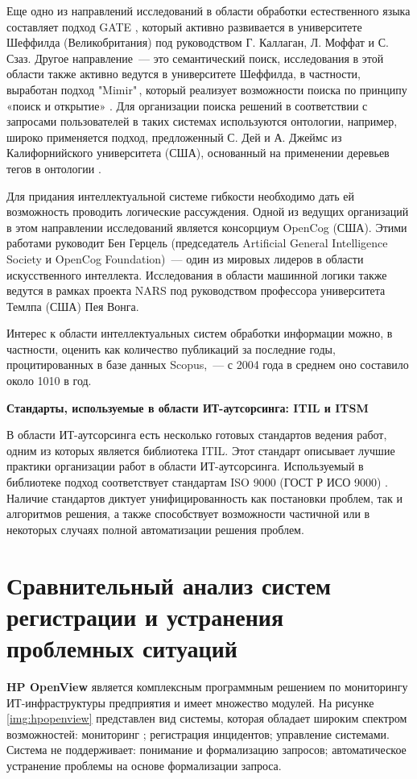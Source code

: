 Еще одно из направлений исследований в области обработки естественного языка составляет подход GATE \cite{GATE-1}, который активно развивается в университете Шеффилда (Великобритания) под руководством Г. Каллаган, Л. Моффат и С. Сзаз. Другое направление~--- это семантический поиск, исследования в этой области также активно ведутся в университете Шеффилда, в частности, выработан подход "Mimir"\,, который реализует возможности поиска по принципу «поиск и открытие» \cite{MIMIR}. Для организации поиска решений в соответствии с запросами пользователей в таких системах используются онтологии, например, широко применяется подход, предложенный С. Дей и А. Джеймс из Калифорнийского университета (США), основанный на применении деревьев тегов в онтологии \cite{ONTCON}. \par
Для придания интеллектуальной системе гибкости необходимо дать ей возможность проводить логические рассуждения. Одной из ведущих организаций в этом направлении исследований является консорциум OpenCog \cite{OpenCog} (США). Этими работами руководит Бен Герцель (председатель Artificial General Intelligence Society и OpenCog Foundation)~--- один из мировых лидеров в области искусственного интеллекта. Исследования в области машинной логики также ведутся в рамках проекта NARS \cite{NARS} под руководством профессора университета Темлпа (США) Пея Вонга. \par 

Интерес к области интеллектуальных систем обработки информации можно, в частности, оценить как количество публикаций за последние годы, процитированных в базе данных Scopus,~--- с 2004 года в среднем оно составило около 1010 в год. \par
\textbf{Стандарты, используемые в области ИТ-аутсорсинга: ITIL и ITSM} \par
В области ИТ-аутсорсинга есть несколько готовых стандартов ведения работ, одним из которых является библиотека ITIL. Этот стандарт описывает лучшие практики организации работ в области ИТ-аутсорсинга. Используемый в библиотеке подход соответствует стандартам ISO 9000 (ГОСТ Р ИСО 9000) \cite{ITIL1, ITIL2, ITIL3}.
Наличие стандартов диктует унифицированность как постановки проблем, так и алгоритмов решения, а также способствует возможности частичной или в некоторых случаях полной автоматизации решения проблем. \par
\clearpage


\section{Сравнительный анализ систем регистрации и устранения проблемных ситуаций} \label{sect3_2}
\textbf{HP OpenView} \cite{HPOpenView, HP1, HP2, HP3} является комплексным программным решением по мониторингу ИТ-инфраструктуры предприятия и имеет множество модулей. На рисунке \ref{img:hpopenview} представлен вид системы, которая обладает широким спектром возможностей: мониторинг \cite{HP4, HP5}; регистрация инцидентов; управление системами. Система не поддерживает: понимание и формализацию запросов; автоматическое устранение проблемы на основе формализации запроса.


